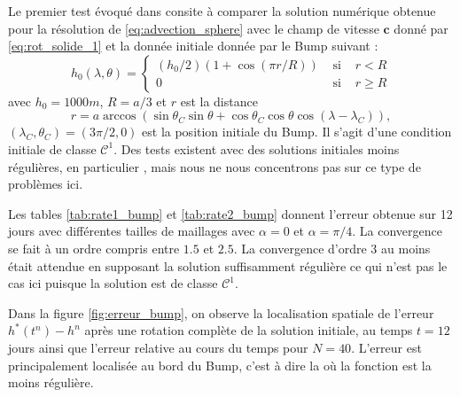 Le premier test évoqué dans \cite{Williamson1992} consite à comparer la solution numérique obtenue pour la résolution de \eqref{eq:advection_sphere} avec le champ de vitesse $\mathbf{c}$ donné par \eqref{eq:rot_solide_1} et la donnée initiale donnée par le Bump suivant :
\begin{equation}
h_0(\lambda, \theta) = \left\lbrace
\begin{array}{ccl}
(h_0/2) (1 + \cos (\pi r/R) ) & \text{ si } & r<R \\
0 & \text{ si } & r \geq R
\end{array}
\right.
\label{eq:initial_solid_body}
\end{equation}
avec $h_0 = 1000 \si{m}$, $R=a/3$ et $r$ est la distance 
\begin{equation}
r = a \arccos \left( \sin \theta_C \sin \theta + \cos \theta_C \cos \theta \cos (\lambda - \lambda_C) \right),
\end{equation}
$(\lambda_C, \theta_C) = (3 \pi / 2 , 0)$ est la position initiale du Bump. Il s'agit d'une condition initiale de classe $\mathcal{C}^1$. Des tests existent avec des solutions initiales moins régulières, en particulier \cite{Nair2010}, mais nous ne nous concentrons pas sur ce type de problèmes ici.

Les tables \ref{tab:rate1_bump} et \ref{tab:rate2_bump} donnent l'erreur obtenue sur 12 jours avec différentes tailles de maillages avec $\alpha=0$ et $\alpha = \pi/4$. La convergence se fait à un ordre compris entre $1.5$ et $2.5$. La convergence d'ordre $3$ au moins était attendue en supposant la solution suffisamment régulière ce qui n'est pas le cas ici puisque la solution est de classe $\mathcal{C}^1$.

Dans la figure \ref{fig:erreur_bump}, on observe la localisation spatiale de l'erreur $h^*(t^n) - h^n$ après une rotation complète de la solution initiale, au temps $t=12$ jours ainsi que l'erreur relative au cours du temps pour $N=40$. L'erreur est principalement localisée au bord du Bump, c'est à dire la où la fonction est la moins régulière.

